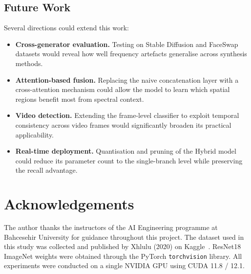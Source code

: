 \documentclass[12pt, a4paper]{article}
\begin{document}
\subsection{Future Work}

Several directions could extend this work:
\begin{itemize}[leftmargin=1.8em]
  \item \textbf{Cross-generator evaluation.}  Testing on Stable Diffusion
    and FaceSwap datasets would reveal how well frequency artefacts
    generalise across synthesis methods.
  \item \textbf{Attention-based fusion.}  Replacing the naive concatenation
    layer with a cross-attention mechanism could allow the model to learn
    which spatial regions benefit most from spectral context.
  \item \textbf{Video detection.}  Extending the frame-level classifier to
    exploit temporal consistency across video frames would significantly
    broaden its practical applicability.
  \item \textbf{Real-time deployment.}  Quantisation and pruning of the
    Hybrid model could reduce its parameter count to the single-branch
    level while preserving the recall advantage.
\end{itemize}

\section*{Acknowledgements}

The author thanks the instructors of the AI Engineering programme at
Bahcesehir University for guidance throughout this project.  The dataset
used in this study was collected and published by Xhlulu (2020) on
Kaggle~\cite{dataset140k}.  ResNet18 ImageNet weights were obtained through
the PyTorch \texttt{torchvision} library.  All experiments were conducted on
a single NVIDIA GPU using CUDA 11.8 / 12.1.



\end{document}
